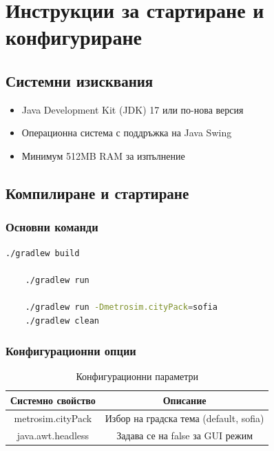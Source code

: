 \documentclass{article}
\begin{document}
\section{Инструкции за стартиране и конфигуриране}

\subsection{Системни изисквания}

\begin{itemize}
	\item Java Development Kit (JDK) 17 или по-нова версия
	\item Операционна система с поддръжка на Java Swing
	\item Минимум 512MB RAM за изпълнение
\end{itemize}

\subsection{Компилиране и стартиране}

\subsubsection{Основни команди}

\begin{lstlisting}[language=bash, caption=Основни Gradle команди]
	./gradlew build
	
	./gradlew run
	
	./gradlew run -Dmetrosim.cityPack=sofia
	./gradlew clean
\end{lstlisting}

\subsubsection{Конфигурационни опции}

\begin{table}[H]
	\centering
	\begin{tabular}{|c|c|}
		\hline
		\textbf{Системно свойство} & \textbf{Описание} \\
		\hline
		metrosim.cityPack & Избор на градска тема (default, sofia) \\
		\hline
		java.awt.headless & Задава се на false за GUI режим \\
		\hline
	\end{tabular}
	\caption{Конфигурационни параметри}
\end{table}
\end{document}

